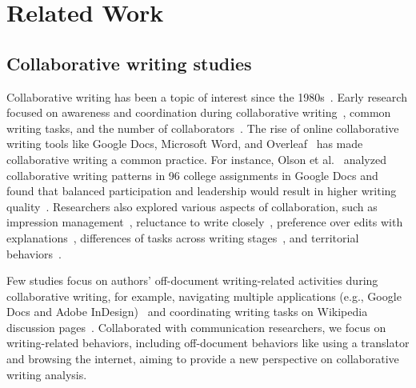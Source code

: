 \section{Related Work}
\label{relatedWork}

\subsection{Collaborative writing studies}

Collaborative writing has been a topic of interest since the 1980s~\cite{engelbart1984collaboration, fish1988quilt, baecker1993user}. Early research focused on awareness and coordination during collaborative writing~\cite{dourish1992awareness}, common writing tasks, and the number of collaborators~\cite{kim2001reviewing}. The rise of online collaborative writing tools like Google Docs, Microsoft Word, and Overleaf~\cite{overleaf} has made collaborative writing a common practice. For instance, Olson et al.~\cite{olson2017people} analyzed collaborative writing patterns in 96 college assignments in Google Docs and found that balanced participation and leadership would result in higher writing quality~\cite{olson2017people}. Researchers also explored various aspects of collaboration, such as impression management~\cite{birnholtz2013write}, reluctance to write closely~\cite{wang2017users},
preference over edits with explanations~\cite{park2023importance}, differences of tasks across writing stages~\cite{sarrafzadeh2021characterizing}, and territorial behaviors~\cite{larsen2019territorial}.

Few studies focus on authors' off-document writing-related activities during collaborative writing, for example, navigating multiple applications (e.g., Google Docs and Adobe InDesign)~\cite{larsen2020collaborative} and coordinating writing tasks on Wikipedia discussion pages~\cite{schneider2011understanding}. 
Collaborated with communication researchers, we focus on writing-related behaviors, including off-document behaviors like using a translator and browsing the internet, aiming to provide a new perspective on collaborative writing analysis. 

